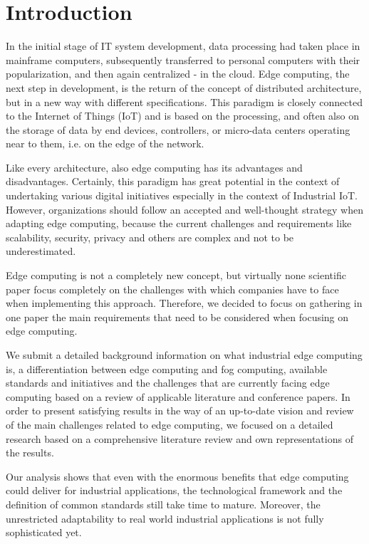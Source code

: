\section{Introduction}\label{sec:introduction}
In the initial stage of IT system development, data processing had taken place in mainframe computers, subsequently transferred to personal computers with their popularization, and then again centralized - in the cloud. Edge computing, the next step in development, is the return of the concept of distributed architecture, but in a new way with different specifications. This paradigm is closely connected to the Internet of Things (IoT) and is based on the processing, and often also on the storage of data by end devices, controllers, or micro-data centers operating near to them, i.e. on the edge of the network.\par 
Like every architecture, also edge computing has its advantages and disadvantages. Certainly, this paradigm has great potential in the context of undertaking various digital initiatives especially in the context of Industrial IoT. However, organizations should follow an accepted and well-thought strategy when adapting edge computing, because the current challenges and requirements like scalability, security, privacy and others are complex and not to be underestimated.\par
Edge computing is not a completely new concept, but virtually none scientific paper focus completely on the challenges with which companies have to face when implementing this approach. Therefore, we decided to focus on gathering in one paper the main requirements that need to be considered when focusing on edge computing. \par
We submit a detailed background information on what industrial edge computing is, a differentiation between edge computing and fog computing, available standards and initiatives and the challenges that are currently facing edge computing based on a review of applicable literature and conference papers. In order to present satisfying results in the way of an up-to-date vision and review of the main challenges related to edge computing, we focused on a detailed research based on a comprehensive literature review and own representations of the results. \par
Our analysis shows that even with the enormous benefits that edge computing could deliver for industrial applications, the technological framework and the definition of common standards still take time to mature. Moreover, the unrestricted adaptability to real world industrial applications is not fully sophisticated yet.\par 
